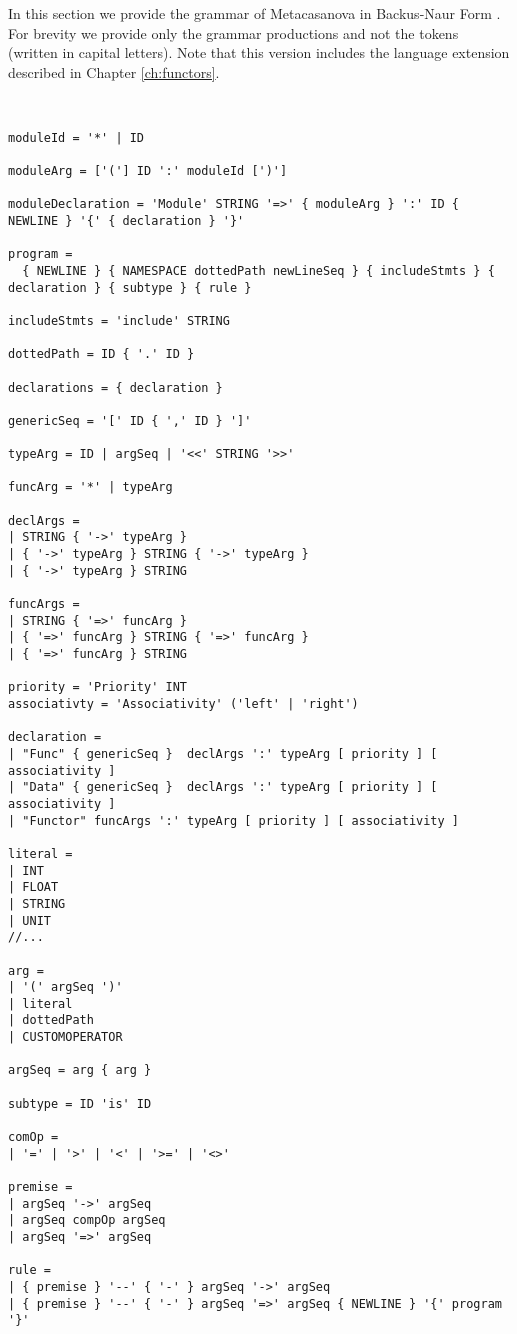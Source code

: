 In this section we provide the grammar of Metacasanova in Backus-Naur Form \cite{knuth1964backus}. For brevity we provide only the grammar productions and not the tokens (written in capital letters). Note that this version includes the language extension described in Chapter \ref{ch:functors}.

\begin{lstlisting}


moduleId = '*' | ID

moduleArg = ['('] ID ':' moduleId [')']

moduleDeclaration = 'Module' STRING '=>' { moduleArg } ':' ID { NEWLINE } '{' { declaration } '}'

program =
  { NEWLINE } { NAMESPACE dottedPath newLineSeq } { includeStmts } { declaration } { subtype } { rule }
  
includeStmts = 'include' STRING
  
dottedPath = ID { '.' ID }

declarations = { declaration }

genericSeq = '[' ID { ',' ID } ']'

typeArg = ID | argSeq | '<<' STRING '>>'

funcArg = '*' | typeArg

declArgs =
| STRING { '->' typeArg }
| { '->' typeArg } STRING { '->' typeArg }
| { '->' typeArg } STRING

funcArgs = 
| STRING { '=>' funcArg }
| { '=>' funcArg } STRING { '=>' funcArg }
| { '=>' funcArg } STRING

priority = 'Priority' INT
associativty = 'Associativity' ('left' | 'right')

declaration =
| "Func" { genericSeq }  declArgs ':' typeArg [ priority ] [ associativity ]
| "Data" { genericSeq }  declArgs ':' typeArg [ priority ] [ associativity ]
| "Functor" funcArgs ':' typeArg [ priority ] [ associativity ]

literal =
| INT
| FLOAT
| STRING
| UNIT
//...

arg =
| '(' argSeq ')'
| literal
| dottedPath
| CUSTOMOPERATOR

argSeq = arg { arg }

subtype = ID 'is' ID

comOp =
| '=' | '>' | '<' | '>=' | '<>'

premise = 
| argSeq '->' argSeq
| argSeq compOp argSeq
| argSeq '=>' argSeq

rule = 
| { premise } '--' { '-' } argSeq '->' argSeq
| { premise } '--' { '-' } argSeq '=>' argSeq { NEWLINE } '{' program '}'


\end{lstlisting}